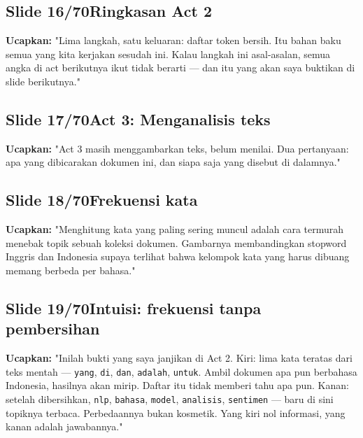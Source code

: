 \documentclass[11pt]{article}
\renewcommand{\framebox}[1]{\colorbox{acc!15}{\textcolor{acc}{\textbf{#1}}}}
\begin{document}
\subsection*{\framebox{Slide 16/70}\quad Ringkasan Act 2}
\textbf{Ucapkan:} "Lima langkah, satu keluaran: daftar token bersih. Itu bahan baku semua yang kita kerjakan sesudah ini. Kalau langkah ini asal-asalan, semua angka di act berikutnya ikut tidak berarti — dan itu yang akan saya buktikan di slide berikutnya."\\[2pt]

\subsection*{\framebox{Slide 17/70}\quad Act 3: Menganalisis teks}
\textbf{Ucapkan:} "Act 3 masih menggambarkan teks, belum menilai. Dua pertanyaan: apa yang dibicarakan dokumen ini, dan siapa saja yang disebut di dalamnya."\\[2pt]

\subsection*{\framebox{Slide 18/70}\quad Frekuensi kata}
\textbf{Ucapkan:} "Menghitung kata yang paling sering muncul adalah cara termurah menebak topik sebuah koleksi dokumen. Gambarnya membandingkan stopword Inggris dan Indonesia supaya terlihat bahwa kelompok kata yang harus dibuang memang berbeda per bahasa."\\[2pt]

\subsection*{\framebox{Slide 19/70}\quad Intuisi: frekuensi tanpa pembersihan}
\textbf{Ucapkan:} "Inilah bukti yang saya janjikan di Act 2. Kiri: lima kata teratas dari teks mentah — \texttt{yang}, \texttt{di}, \texttt{dan}, \texttt{adalah}, \texttt{untuk}. Ambil dokumen apa pun berbahasa Indonesia, hasilnya akan mirip. Daftar itu tidak memberi tahu apa pun. Kanan: setelah dibersihkan, \texttt{nlp}, \texttt{bahasa}, \texttt{model}, \texttt{analisis}, \texttt{sentimen} — baru di sini topiknya terbaca. Perbedaannya bukan kosmetik. Yang kiri nol informasi, yang kanan adalah jawabannya."\\[2pt]
\end{document}
